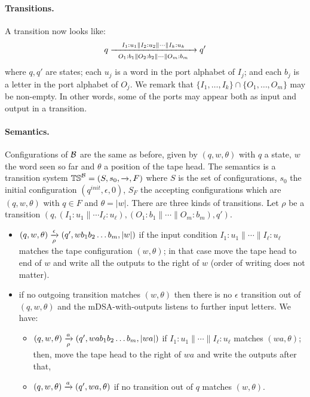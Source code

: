 \paragraph*{Transitions.} A transition now looks like:
\begin{align*}
q \xrightarrow[~~O_1: b_1 \parallel O_2: b_2 \parallel \cdots \parallel O_m: b_m~~]{I_1: u_1 \parallel I_2: u_2 \parallel \cdots \parallel I_k: u_k} q'
\end{align*}
where $q, q'$ are states; each $u_j$ is a word in the port alphabet of $I_j$; and each $b_j$ is a letter in the port alphabet of $O_j$. We remark that $\{I_1, \dots, I_k\} \cap \{O_1, \dots, O_m\}$ may be non-empty. In other words, some of the ports may appear both as input and output in a transition.  

\paragraph*{Semantics.} Configurations of $\mathcal{B}$ are the same as before, given by $(q, w, \theta)$ with $q$ a state, $w$ the word seen so far and $\theta$ a position of the tape head. The semantics is a transition system $\mathbb{TS}^{\mathcal{B}} = (S, s_0, \xrightarrow{}, F)$ where $S$ is the set of configurations, $s_0$ the initial configuration $(q^{init}, \epsilon, 0)$, $S_F$ the accepting configurations which are $(q, w, \theta)$ with $q \in F$ and $\theta = |w|$. There are three kinds of transitions. Let $\rho$ be a transition $(q, (I_1: u_1 \parallel \cdots I_\ell:u_\ell), (O_1: b_1 \parallel \cdots \parallel O_m: b_m), q')$.
\begin{itemize}
\item $(q, w, \theta) \xrightarrow[\rho]{\epsilon} (q', wb_1 b_2 \dots b_m, |w|)$ if the input condition $I_1:u_1 \parallel \cdots \parallel I_\ell:u_\ell$ matches the tape configuration $(w, \theta)$; in that case move the tape head to end of $w$ and write all the outputs to the right of $w$ (order of writing does not matter).
\item if no outgoing transition matches $(w, \theta)$ then there is no $\epsilon$ transition out of $(q, w, \theta)$ and the mDSA-with-outputs listens to further input letters. We have:
\begin{itemize}
\item $(q, w, \theta) \xrightarrow[\rho]{a} (q', wab_1 b_2 \dots b_m, |wa|)$ if $I_1:u_1 \parallel \cdots \parallel I_\ell:u_\ell$ matches $(wa, \theta)$; then, move the tape head to the right of $wa$ and write the outputs after that,
\item $(q, w, \theta) \xrightarrow{a} (q', wa, \theta)$ if no transition out of $q$ matches $(w, \theta)$.
\end{itemize}
\end{itemize} 


